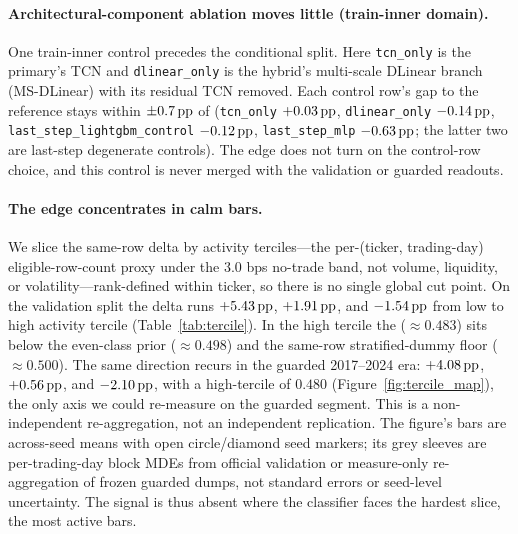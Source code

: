 \paragraph{Architectural-component ablation moves little (train-inner domain).}
One train-inner control precedes the conditional split. Here \texttt{tcn\_only} is
the primary's TCN and \texttt{dlinear\_only} is the hybrid's multi-scale DLinear
branch (MS-DLinear) with its residual TCN removed. Each control row's gap to
the reference stays within $\pm0.7\,\textrm{pp}$ of \macrofone{} (\texttt{tcn\_only}
$+0.03\,\textrm{pp}$, \texttt{dlinear\_only} $-0.14\,\textrm{pp}$,
\texttt{last\_step\_lightgbm\_control} $-0.12\,\textrm{pp}$, \texttt{last\_step\_mlp}
$-0.63\,\textrm{pp}$; the latter two are last-step degenerate controls). The edge does not
turn on the control-row choice, and this control is never merged with the
validation or guarded readouts.

\paragraph{The edge concentrates in calm bars.}
We slice the same-row \macrofone{} delta by activity terciles---the
per-(ticker, trading-day) eligible-row-count proxy under the $3.0$ bps no-trade
band, not volume, liquidity, or volatility---rank-defined within ticker, so
there is no single global cut point. On the validation split the delta runs
$+5.43\,\textrm{pp}$, $+1.91\,\textrm{pp}$, and $-1.54\,\textrm{pp}$ from low to high activity tercile
(Table~\ref{tab:tercile}). In the high tercile the \macrofone{} ($\approx
0.483$) sits below the even-class prior ($\approx 0.498$) and the same-row
stratified-dummy floor ($\approx 0.500$). The same direction recurs in the
guarded 2017--2024 era: $+4.08\,\textrm{pp}$, $+0.56\,\textrm{pp}$, and $-2.10\,\textrm{pp}$, with a
high-tercile \macrofone{} of $0.480$ (Figure~\ref{fig:tercile_map}), the only
axis we could re-measure on the guarded segment. This is a non-independent
re-aggregation, not an independent replication. The figure's bars are
across-seed means with open circle/diamond seed markers; its grey sleeves are
per-trading-day block MDEs from official validation or measure-only
re-aggregation of frozen guarded dumps, not standard errors or seed-level
uncertainty. The signal is thus absent where the classifier faces the
hardest slice, the most active bars.

